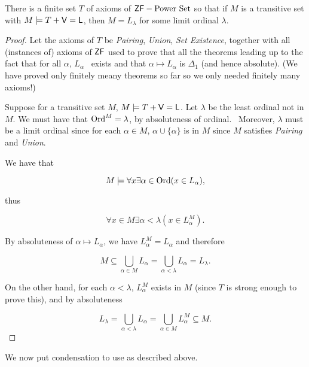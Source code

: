 \begin{lemma}\label{lem-condensation}There is a finite set $T$ of axioms of $\mathsf{ZF} - \text{Power Set}$ so that if $M$ is a transitive set with $M\models T + \mathsf{V=L}$, then $M = L_\lambda$ for some limit ordinal $\lambda$.

\end{lemma}\begin{proof}Let the axioms of $T$ be \textit{Pairing}, \textit{Union}, \textit{Set Existence}, together with all (instances of) axioms of $\mathsf{ZF}$ used to prove that all the theorems leading up to the fact that for all $\alpha$, $L_\alpha$  exists and that $\alpha \mapsto L_\alpha$ is $\Delta_1$ (and hence absolute). (We have proved only finitely meany theorems so far so we only needed finitely many axioms!)

Suppose for a transitive set $M$, $M\models T + \mathsf{V=L}$. Let $\lambda$ be the least ordinal not in $M$.
We must have that $\operatorname{Ord}^M = \lambda$, by absoluteness of
ordinal.  Moreover, $\lambda$ must be a limit ordinal since for each $\alpha \in M$, $\alpha \cup \{\alpha\}$ is in $M$ since $M$ satisfies \textit{Pairing} and \textit{Union}.

We have that

\begin{equation}
M\models \forall x \exists \alpha\in \operatorname{Ord} (x \in L_\alpha),
\end{equation}

thus

\begin{equation}
\forall x \in M  \exists \alpha < \lambda (x \in L^M_\alpha).
\end{equation}

By absoluteness of $\alpha \mapsto L_\alpha$, we have $L^M_\alpha = L_\alpha$ and therefore

\begin{equation}
M \subseteq \bigcup_{\alpha \in M} L_\alpha =  \bigcup_{\alpha < \lambda} L_\alpha = L_\lambda.
\end{equation}

On the other hand, for each $\alpha < \lambda$, $L_\alpha^M$ exists in $M$ (since $T$ is strong enough to prove this), and by absoluteness

\begin{equation}
L_\lambda =   \bigcup_{\alpha < \lambda} L_\alpha =  \bigcup_{\alpha \in M} L^M_\alpha \subseteq M.
\end{equation}

\end{proof}We now put condensation to use as described above.

